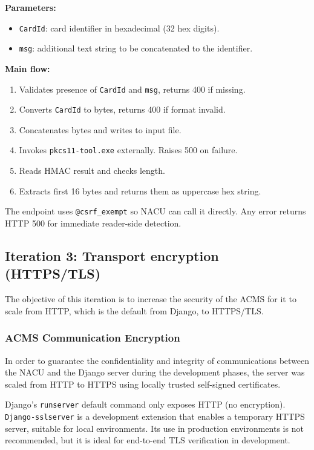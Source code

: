 \textbf{Parameters:}
\begin{itemize}
	\item \texttt{CardId}: card identifier in hexadecimal (32 hex digits).
	\item \texttt{msg}: additional text string to be concatenated to the identifier.
\end{itemize}

\textbf{Main flow:}
\begin{enumerate}
	\item Validates presence of \texttt{CardId} and \texttt{msg}, returns 400 if missing.
	\item Converts \texttt{CardId} to bytes, returns 400 if format invalid.
	\item Concatenates bytes and writes to input file.
	\item Invokes \texttt{pkcs11-tool.exe} externally. Raises 500 on failure.
	\item Reads HMAC result and checks length.
	\item Extracts first 16 bytes and returns them as uppercase hex string.
\end{enumerate}


The endpoint uses \texttt{@csrf\_exempt} so NACU can call it directly. Any error returns HTTP 500 for immediate reader-side detection.


\subsection{Iteration 3: Transport encryption (HTTPS/TLS)}
\label{subsec:https}

The objective of this iteration is to increase the security of the ACMS for it to scale from HTTP, which is the default from Django, to HTTPS/TLS.

\subsubsection{ACMS Communication Encryption}

In order to guarantee the confidentiality and integrity of communications between the NACU and the Django server during the development phases, the server was scaled from HTTP to HTTPS using locally trusted self-signed certificates.

Django's \texttt{runserver} default command only exposes HTTP (no encryption). \texttt{Django-sslserver} \cite{Ref47} is a development extension that enables a temporary HTTPS server, suitable for local environments. Its use in production environments is not recommended, but it is ideal for end-to-end TLS verification in development.

